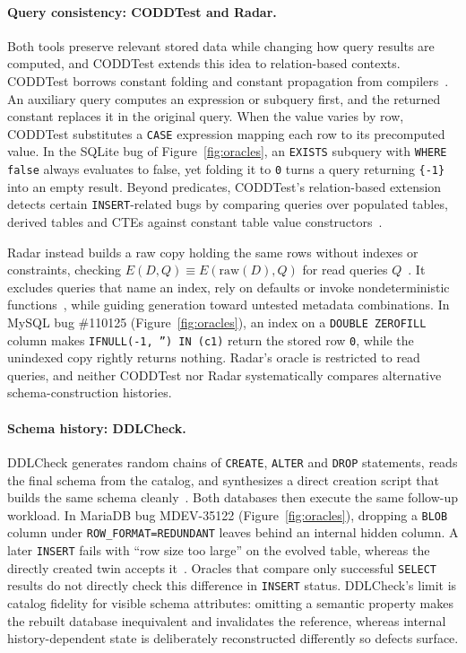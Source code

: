 \paragraph{Query consistency: CODDTest and Radar.} Both tools preserve relevant stored data while changing how query results are computed, and CODDTest extends this idea to relation-based contexts. CODDTest borrows constant folding and constant propagation from compilers~\cite[Sec.~3]{coddtest}. An auxiliary query computes an expression or subquery first, and the returned constant replaces it in the original query. When the value varies by row, CODDTest substitutes a \texttt{CASE} expression mapping each row to its precomputed value. In the SQLite bug of Figure~\ref{fig:oracles}, an \texttt{EXISTS} subquery with \texttt{WHERE false} always evaluates to false, yet folding it to \texttt{0} turns a query returning \texttt{\{-1\}} into an empty result. Beyond predicates, CODDTest's relation-based extension detects certain \texttt{INSERT}-related bugs by comparing queries over populated tables, derived tables and CTEs against constant table value constructors~\cite[Sec.~3.4, Listings~6--7]{coddtest}.

Radar instead builds a raw copy holding the same rows without indexes or constraints, checking $E(D,Q)\equiv E(\mathrm{raw}(D),Q)$ for read queries $Q$~\cite{radar}. It excludes queries that name an index, rely on defaults or invoke nondeterministic functions~\cite[Sec.~3.2.2]{radar}, while guiding generation toward untested metadata combinations. In MySQL bug \#110125 (Figure~\ref{fig:oracles}), an index on a \texttt{DOUBLE ZEROFILL} column makes \texttt{IFNULL(-1, '') IN (c1)} return the stored row \texttt{0}, while the unindexed copy rightly returns nothing. Radar's oracle is restricted to read queries, and neither CODDTest nor Radar systematically compares alternative schema-construction histories.

\paragraph{Schema history: DDLCheck.} DDLCheck generates random chains of \texttt{CREATE}, \texttt{ALTER} and \texttt{DROP} statements, reads the final schema from the catalog, and synthesizes a direct creation script that builds the same schema cleanly~\cite{ddlcheck}. Both databases then execute the same follow-up workload. In MariaDB bug MDEV-35122 (Figure~\ref{fig:oracles}), dropping a \texttt{BLOB} column under \texttt{ROW\_FORMAT=REDUNDANT} leaves behind an internal hidden column. A later \texttt{INSERT} fails with ``row size too large'' on the evolved table, whereas the directly created twin accepts it~\cite[Listing~1]{ddlcheck}. Oracles that compare only successful \texttt{SELECT} results do not directly check this difference in \texttt{INSERT} status. DDLCheck's limit is catalog fidelity for visible schema attributes: omitting a semantic property makes the rebuilt database inequivalent and invalidates the reference, whereas internal history-dependent state is deliberately reconstructed differently so defects surface.

